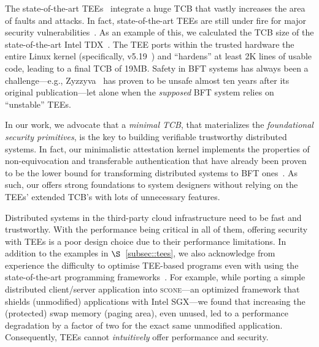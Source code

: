  The state-of-the-art TEEs~\cite{amd-sev, intelTDX} integrate a huge TCB that vastly increases the area of faults and attacks. In fact, state-of-the-art TEEs are still under fire for major security vulnerabilities~\cite{intel_sgx_vulnerabilities1, intel_sgx_vulnerabilities2, intel_sgx_vulnerabilities3, intel_sgx_vulnerabilities4, intel_sgx_vulnerabilities5}. As an example of this, we calculated the TCB size of the state-of-the-art Intel TDX~\cite{intelTDX}. The TEE ports within the trusted hardware the entire Linux kernel (specifically, v5.19~\cite{linuxlifecircle}) and ``hardens'' at least 2K lines of usable code, leading to a final TCB of 19MB. Safety in BFT systems has always been a challenge---e.g., Zyzzyva~\cite{unsafe_Zyzzyva} has proven to be unsafe almost ten years after its original publication---let alone when the {\em supposed} BFT system relies on ``unstable'' TEEs. 

 In our work, we advocate that a {\em minimal TCB}, that materializes the {\em foundational security primitives}, is the key to building verifiable trustworthy distributed systems. In fact, our minimalistic attestation kernel implements the properties of non-equivocation and transferable authentication that have already been proven to be the lower bound for transforming distributed systems to BFT ones~\cite{clement2012}. As such, our \projecttitle{} offers strong foundations to system designers without relying on the TEEs' extended TCB's with lots of unnecessary features.


 Distributed systems in the third-party cloud infrastructure need to be fast and trustworthy. With the performance being critical in all of them, offering security with TEEs is a poor design choice due to their performance limitations. In addition to the examples in $\S$~\ref{subsec::tees}, we also acknowledge from experience the difficulty to optimise TEE-based programs even with using the state-of-the-art programming frameworks~\cite{scone}. For example, while porting a simple distributed client/server application into \textsc{scone}---an optimized framework that shields (unmodified) applications with Intel SGX---we found that increasing the (protected) swap memory (paging area), even unused, led to a performance degradation by a factor of two for the exact same unmodified application. Consequently, TEEs cannot {\em intuitively} offer performance and security.

